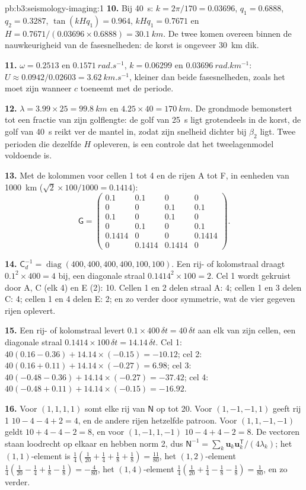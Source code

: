 \begin{solution}{pb:b3:seismology-imaging:1}
\textbf{10.} Bij \qty{40}{s}: $k = 2\pi/170 = 0.03696$, $q_1 = 0.6888$,
$q_2 = 0.3287$, $\tan(kHq_1) = 0.964$, $kHq_1 = 0.7671$ en
$H = 0.7671/(0.03696\times0.6888) = \qty{30.1}{km}$. De twee komen overeen binnen de
nauwkeurigheid van de fasesnelheden: de korst is ongeveer \qty{30}{km} dik.

\textbf{11.} $\omega = 0.2513$ en $\qty{0.1571}{rad.s^{-1}}$, $k = 0.06299$ en
$\qty{0.03696}{rad.km^{-1}}$: $U \approx 0.0942/0.02603 = \qty{3.62}{km.s^{-1}}$,
kleiner dan beide fasesnelheden, zoals het moet zijn wanneer $c$ toeneemt met de
periode.

\textbf{12.} $\lambda = 3.99\times25 = \qty{99.8}{km}$ en $4.25\times40 =
\qty{170}{km}$. De grondmode bemonstert tot een fractie van zijn golflengte: de golf
van 25~s ligt grotendeels in de korst, de golf van 40~s reikt ver de mantel in, zodat
zijn snelheid dichter bij $\beta_2$ ligt. Twee perioden die dezelfde $H$ opleveren, is
een controle dat het tweelagenmodel voldoende is.

\textbf{13.} Met de kolommen voor cellen 1 tot 4 en de rijen A tot F, in eenheden van
\qty{1000}{km} ($\sqrt2\times100/1000 = 0.1414$):
\[
  \mathsf G = \begin{pmatrix}
  0.1 & 0.1 & 0 & 0 \\ 0 & 0 & 0.1 & 0.1 \\ 0.1 & 0 & 0.1 & 0 \\
  0 & 0.1 & 0 & 0.1 \\ 0.1414 & 0 & 0 & 0.1414 \\ 0 & 0.1414 & 0.1414 & 0
  \end{pmatrix}.
\]

\textbf{14.} $\mathsf C_d^{-1} = \operatorname{diag}(400, 400, 400, 400, 100,
100)$. Een rij- of kolomstraal draagt $0.1^2\times400 = 4$ bij, een diagonale straal
$0.1414^2\times100 = 2$. Cel 1 wordt gekruist door A, C (elk 4) en E (2): 10. Cellen
1 en 2 delen straal A: 4; cellen 1 en 3 delen C: 4; cellen 1 en 4 delen E: 2; en
zo verder door symmetrie, wat de vier gegeven rijen oplevert.

\textbf{15.} Een rij- of kolomstraal levert $0.1\times400\,\delta t = 40\,
\delta t$ aan elk van zijn cellen, een diagonale straal $0.1414\times100\,\delta t =
14.14\,\delta t$. Cel 1: $40(0.16 - 0.36) + 14.14\times(-0.15) = -10.12$; cel
2: $40(0.16 + 0.11) + 14.14\times(-0.27) = 6.98$; cel 3: $40(-0.48 - 0.36) +
14.14\times(-0.27) = -37.42$; cel 4: $40(-0.48 + 0.11) + 14.14\times(-0.15) =
-16.92$.

\textbf{16.} Voor $(1,1,1,1)$ somt elke rij van $\mathsf N$ op tot 20. Voor
$(1,-1,-1,1)$ geeft rij 1 $10 - 4 - 4 + 2 = 4$, en de andere rijen hetzelfde
patroon. Voor $(1,1,-1,-1)$ geldt $10 + 4 - 4 - 2 = 8$, en voor $(1,-1,1,-1)$
$10 - 4 + 4 - 2 = 8$. De vectoren staan loodrecht op elkaar en hebben norm 2, dus
$\mathsf N^{-1} = \sum_k \mathbf u_k\mathbf u_k^{\mathsf T}/(4\lambda_k)$; het
$(1,1)$-element is $\tfrac14(\tfrac1{20} + \tfrac14 + \tfrac18 + \tfrac18) =
\tfrac{11}{80}$, het $(1,2)$-element $\tfrac14(\tfrac1{20} - \tfrac14 + \tfrac18
- \tfrac18) = -\tfrac4{80}$, het $(1,4)$-element $\tfrac14(\tfrac1{20} +
\tfrac14 - \tfrac18 - \tfrac18) = \tfrac1{80}$, en zo verder.


\end{solution}
